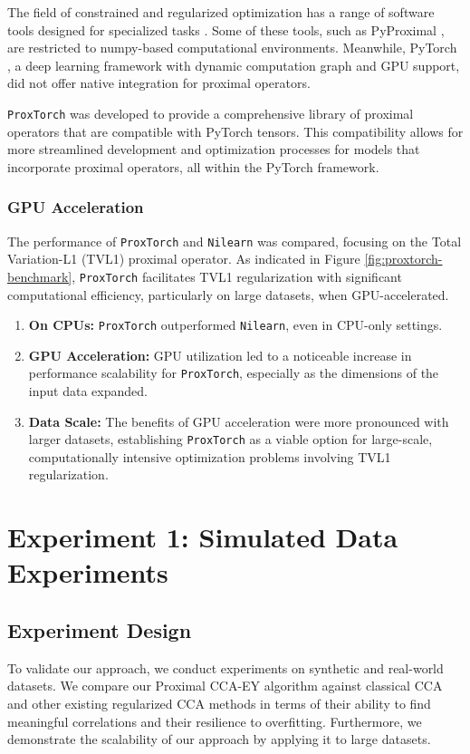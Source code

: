 The field of constrained and regularized optimization has a range of software tools designed for specialized tasks \citep{Moolekamp, ParsimonY}. Some of these tools, such as PyProximal \citep{pyproximal}, are restricted to numpy-based computational environments. Meanwhile, PyTorch \citep{paszke2019pytorch}, a deep learning framework with dynamic computation graph and GPU support, did not offer native integration for proximal operators. 

\texttt{ProxTorch} was developed to provide a comprehensive library of proximal operators that are compatible with PyTorch tensors. This compatibility allows for more streamlined development and optimization processes for models that incorporate proximal operators, all within the PyTorch framework.

\subsubsection{GPU Acceleration}

The performance of \texttt{ProxTorch} and \texttt{Nilearn} was compared, focusing on the Total Variation-L1 (TVL1) proximal operator. As indicated in Figure \ref{fig:proxtorch-benchmark}, \texttt{ProxTorch} facilitates TVL1 regularization with significant computational efficiency, particularly on large datasets, when GPU-accelerated.

\begin{enumerate}
    \item \textbf{On CPUs:} \texttt{ProxTorch} outperformed \texttt{Nilearn}, even in CPU-only settings.
    
    \item \textbf{GPU Acceleration:} GPU utilization led to a noticeable increase in performance scalability for \texttt{ProxTorch}, especially as the dimensions of the input data expanded. 
    
    \item \textbf{Data Scale:} The benefits of GPU acceleration were more pronounced with larger datasets, establishing \texttt{ProxTorch} as a viable option for large-scale, computationally intensive optimization problems involving TVL1 regularization.
\end{enumerate}


\section{Experiment 1: Simulated Data Experiments}
\subsection{Experiment Design}
To validate our approach, we conduct experiments on synthetic and real-world datasets.
We compare our Proximal CCA-EY algorithm against classical CCA and other existing regularized CCA methods in terms of their ability to find meaningful correlations and their resilience to overfitting.
Furthermore, we demonstrate the scalability of our approach by applying it to large datasets.

